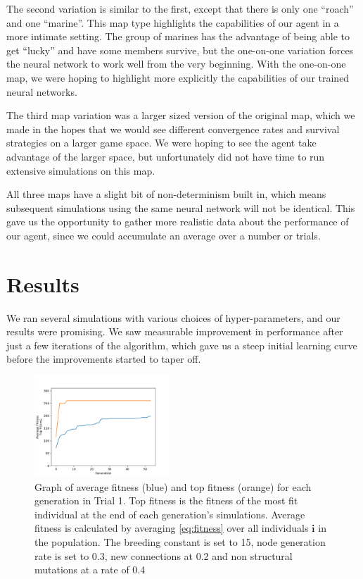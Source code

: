 \documentclass{article}
\begin{document}
The second variation is similar to the first, except that there is only one
``roach'' and one ``marine''. This map type highlights the capabilities of our
agent in a more intimate setting. The group of marines has the advantage of
being able to get ``lucky'' and have some members survive, but the one-on-one
variation forces the neural network to work well from the very beginning.  With
the one-on-one map, we were hoping to highlight more explicitly the capabilities
of our trained neural networks.

The third map variation was a larger sized version of the original map, which we
made in the hopes that we would see different convergence rates and survival
strategies on a larger game space. We were hoping to see the agent take
advantage of the larger space, but unfortunately did not have time to run
extensive simulations on this map.

All three maps have a slight bit of non-determinism built in, which means
subsequent simulations using the same neural network will not be identical. This
gave us the opportunity to gather more realistic data about the performance of
our agent, since we could accumulate an average over a number or trials.

\section{Results} We ran several simulations with various choices of
hyper-parameters, and our results were promising. We saw measurable improvement
in performance after just a few iterations of the algorithm, which gave us a
steep initial learning curve before the improvements started to taper off.

\begin{figure}[h]\label{fig:fitness graph}
\centering
\includegraphics[width=0.45\textwidth]{fig_1}
\begin{changemargin}{0.15in}{0.15in}
  \caption{Graph of average fitness (blue) and top fitness (orange) for each
    generation in Trial 1. Top fitness is the fitness of the most fit individual
    at the end of each generation's simulations. Average fitness is calculated
    by averaging \eqref{eq:fitness} over all individuals $\bm{i}$ in the
    population. The breeding constant is set to 15, node generation rate is set
    to 0.3, new connections at 0.2 and non structural mutations at a rate of
    0.4}
\end{changemargin}
\end{figure}
\end{document}
